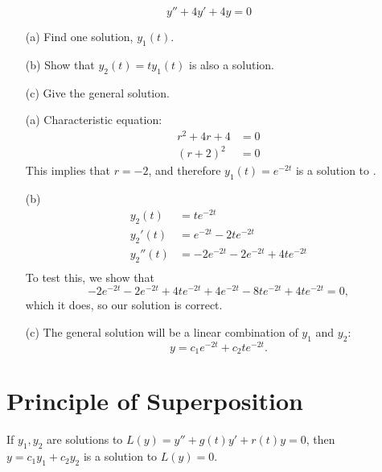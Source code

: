 \begin{ex}
    \begin{equation}
        y'' + 4y' + 4y = 0
        \label{eq:sec_ord_ode}
    \end{equation}
    \begin{enumerate}
        \item[(a)] Find one solution, $y_1 (t)$.
        \item[(b)] Show that $y_2(t) = ty_1(t)$ is also a solution.
        \item[(c)] Give the general solution.
    \end{enumerate}
    \begin{sol}
        \begin{enumerate}
            \item[(a)] Characteristic equation:
                \begin{align} 
                    r^2 + 4r + 4 &= 0 \\
                    (r + 2) ^2   &= 0
                \end{align}
                This implies that $r = - 2$, and therefore $y_1(t)= e^{-2t}$
                is a solution to .
            \item[(b)]
                \begin{align}
                    y_2    (t) &= t e^{-2t} \\
                    y_2 '  (t) &= e^{-2t} - 2 t e^{-2t} \\
                    y_2 '' (t) &= -2 e^{-2t} - 2 e^{-2t} + 4t e^{-2t} \\
                \end{align}
                To test this, we show that
                \[ -2e^{-2t} - 2e^{-2t} + 4te^{-2t} + 4e^{-2t} -8te^{-2t} + 4te^{-2t} = 0, \]
                which it does, so our solution is correct.
            \item[(c)]
                The general solution will be a linear combination of $y_1$
                and $y_2$:
                \[ y = c_1 e^{-2t} + c_2te^{-2t}. \]
        \end{enumerate}
    \end{sol}
\end{ex}

\section{Principle of Superposition}
If $y_1, y_2$ are solutions to $L(y) = y'' +g(t) y' + r(t) y = 0$, then
$y=c_1 y_1 + c_2 y_2$ is a solution to $L(y) = 0$.

